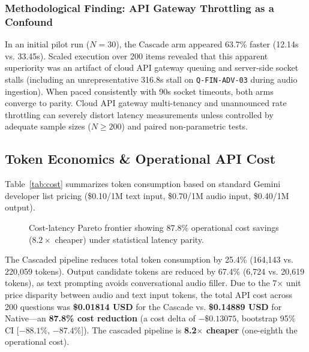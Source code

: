 \documentclass[10pt,a4paper,twocolumn]{article}
\begin{document}
\subsubsection{Methodological Finding: API Gateway Throttling as a Confound}
In an initial pilot run ($N = 30$), the Cascade arm appeared 63.7\% faster (12.14s vs. 33.45s). Scaled execution over 200 items revealed that this apparent superiority was an artifact of cloud API gateway queuing and server-side socket stalls (including an unrepresentative 316.8s stall on \texttt{Q-FIN-ADV-03} during audio ingestion). When paced consistently with 90s socket timeouts, both arms converge to parity. Cloud API gateway multi-tenancy and unannounced rate throttling can severely distort latency measurements unless controlled by adequate sample sizes ($N \ge 200$) and paired non-parametric tests.

\subsection{Token Economics \& Operational API Cost}
Table~\ref{tab:cost} summarizes token consumption based on standard Gemini developer list pricing (\$0.10/1M text input, \$0.70/1M audio input, \$0.40/1M output).



\begin{figure}[t]
\centering
{}
\caption{Cost-latency Pareto frontier showing 87.8\% operational cost savings ($8.2\times$ cheaper) under statistical latency parity.}
\label{fig:pareto}
\end{figure}

The Cascaded pipeline reduces total token consumption by 25.4\% (164,143 vs. 220,059 tokens). Output candidate tokens are reduced by 67.4\% (6,724 vs. 20,619 tokens), as text prompting avoids conversational audio filler. Due to the 7$\times$ unit price disparity between audio and text input tokens, the total API cost across 200 questions was \textbf{\$0.01814 USD} for the Cascade vs. \textbf{\$0.14889 USD} for Native—an \textbf{87.8\% cost reduction} (a cost delta of $-\$0.13075$, bootstrap 95\% CI [$-88.1\%$, $-87.4\%$]). The cascaded pipeline is \textbf{8.2$\times$ cheaper} (one-eighth the operational cost).
\end{document}
